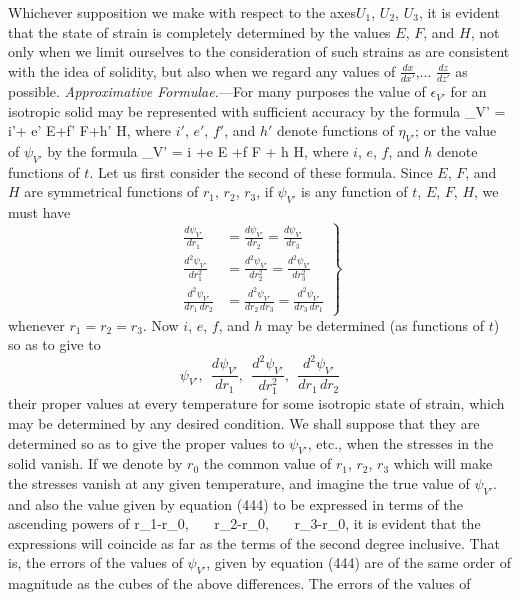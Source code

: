 \documentclass[12pt]{article}
\begin{document}
{Whichever supposition we make with respect to the axes$U_1$, $U_2$, $U_3$, it is evident that the state of strain is completely determined by the values $E$, $F$, and $H$, not only when we limit ourselves to the consideration of such strains as are consistent with the idea of solidity, but also when we regard any values of $\frac{dx}{dx'}$,... $\frac{dz}{dz'}$ as possible.
\textit{Approximative Formulae.}---For many purposes the value of $\epsilon_{V'}$ for an isotropic solid may be represented with sufficient accuracy by the formula
\eqs \epsilon_{V'} = i'+ e' E+f' F+h' H,   \label{443}\eqe
where $i'$, $e'$, $f'$, and $h'$ denote functions of $\eta_{V'}$; or the value of $\psi_{V'}$ by the formula
\eqs \psi_{V'} = i +e E +f F + h H,       \label{444}\eqe
where $i$, $e$, $f$, and $h$ denote functions of $t$. Let us first consider the second of these formula. Since $E$, $F$, and $H$ are symmetrical functions of $r_1$, $r_2$, $r_3$, if $\psi_{V'}$ is any function of $t$, $E$, $F$, $H$, we must have
\begin{equation} \left. \begin{aligned}
\frac{d\psi_{V'}}{dr_1}&=\frac{d\psi_{V'}}{dr_2}=\frac{d\psi_{V'}}{dr_3} \\
\frac{d^2\psi_{V'}}{dr_1^2}&=\frac{d^2\psi_{V'}}{dr_2^2}=\frac{d^2\psi_{V'}}{dr_3^2} \\
\frac{d^2\psi_{V'}}{dr_1 \, dr_2}&=\frac{d^2\psi_{V'}}{dr_2\, dr_3}=\frac{d^2\psi_{V'}}{dr_3\,dr_1} \end{aligned}\right\}\label{445}\end{equation}
whenever $r_1=r_2=r_3$.   Now $i$, $e$, $f$, and $h$ may be determined (as functions of $t$) so as to give to
$$\psi_{V'},\ \ \frac{d\psi_{V'}}{dr_1}, \ \ \frac{d^2\psi_{V'}}{dr_1^2}, \ \ \frac{d^2\psi_{V'}}{dr_1 \, dr_2}$$
their proper values at every temperature for some isotropic state of strain, which may be determined by any desired condition. We shall suppose that they are determined so as to give the proper values to $\psi_{V'}$, etc., when the stresses in the solid vanish.  If we denote by $r_0$ the common value of $r_1$, $r_2$, $r_3$ which will make the stresses vanish at any given temperature, and imagine the true value of $\psi_{V'}$. and also the value given by equation (444) to be expressed in terms of the ascending powers of
\eqs r_1-r_0, \ \ \   r_2-r_0, \ \ \ r_3-r_0,   \label{446}\eqe
it is evident that the expressions will coincide as far as the terms of the second degree inclusive. That is, the errors of the values of $\psi_{V'}$, given by equation (444) are of the same order of magnitude as the cubes of the above differences. The errors of the values of
}
\end{document}

